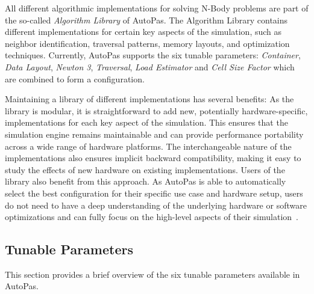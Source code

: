 \documentclass[conference]{IEEEtran}
\begin{document}


All different algorithmic implementations for solving N-Body problems are part of the so-called \textit{Algorithm Library} of AutoPas. The Algorithm Library contains different implementations for certain key aspects of the simulation, such as neighbor identification, traversal patterns, memory layouts, and optimization techniques. Currently, AutoPas supports the six tunable parameters: \textit{Container}, \textit{Data Layout}, \textit{Newton 3}, \textit{Traversal}, \textit{Load Estimator} and \textit{Cell Size Factor} which are combined to form a configuration.

Maintaining a library of different implementations has several benefits: As the library is modular, it is straightforward to add new, potentially hardware-specific, implementations for each key aspect of the simulation. This ensures that the simulation engine remains maintainable and can provide performance portability across a wide range of hardware platforms. The interchangeable nature of the implementations also ensures implicit backward compatibility, making it easy to study the effects of new hardware on existing implementations. Users of the library also benefit from this approach. As AutoPas is able to automatically select the best configuration for their specific use case and hardware setup, users do not need to have a deep understanding of the underlying hardware or software optimizations and can fully focus on the high-level aspects of their simulation~\cite{Tchipev2020}\cite{Gratl2022AutoPas}.

\subsection{Tunable Parameters}

This section provides a brief overview of the six tunable parameters available in AutoPas.
\end{document}

